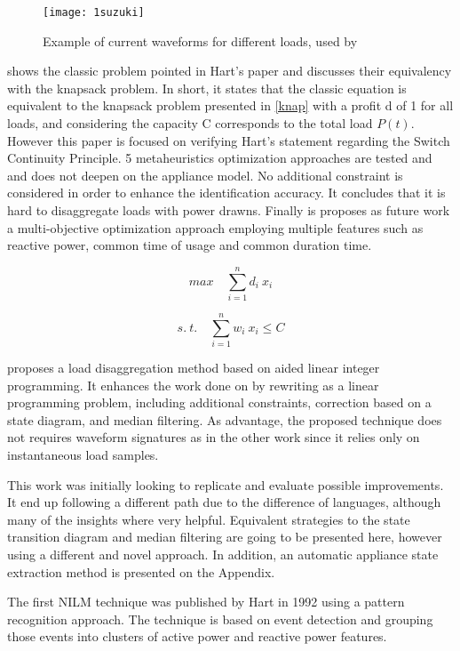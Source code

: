 \begin{figure}
    \centering
    \texttt{[image: 1suzuki]}
    \caption{Example of current waveforms for different loads, used by \cite{suzuki}}
    \label{1suzuki}
\end{figure}


\cite{meta} shows the classic problem pointed in Hart's paper and discusses their equivalency with the knapsack problem. In short, it states that the classic equation is equivalent to the knapsack problem presented in \ref{knap} with a profit d of 1 for all loads, and considering the capacity C corresponds to the total load $P(t)$. However this paper is focused on verifying Hart’s statement regarding the Switch Continuity Principle. 5 metaheuristics optimization approaches are tested and  and does not deepen on the appliance model. No additional constraint is considered in order to enhance the identification accuracy. It concludes that it is hard to disaggregate loads with power drawns.
Finally is proposes as future work a multi-objective optimization approach employing multiple features such as reactive power, common time of usage and common duration time.

\begin{equation} \label{knap}
   max \quad \sum_{i=1}^{n} d_i \ x_i
\end{equation}

$$ s. \ t. \quad \sum_{i=1}^{n} w_i \ x_i \leq C $$

\cite{stephen} proposes a load disaggregation method based on aided linear integer programming. It enhances the work done on \cite{suzuki} by rewriting as a linear programming problem, including additional constraints, correction based on a state diagram, and median filtering. As advantage, the proposed technique does not requires waveform signatures as in the other work since it relies only on instantaneous load samples. 

This work was initially looking to replicate \cite{stephen} and evaluate possible improvements. It end up following a different path due to the difference of languages, although many of the insights where very helpful. Equivalent strategies to the state transition diagram and median filtering are going to be presented here, however using a different and novel approach. In addition, an automatic appliance state extraction method is presented on the Appendix. 


The first NILM technique was published by Hart \cite{hart} in 1992 using a pattern recognition approach. The technique is based on event detection and grouping those events into clusters of active power and reactive power features. 

